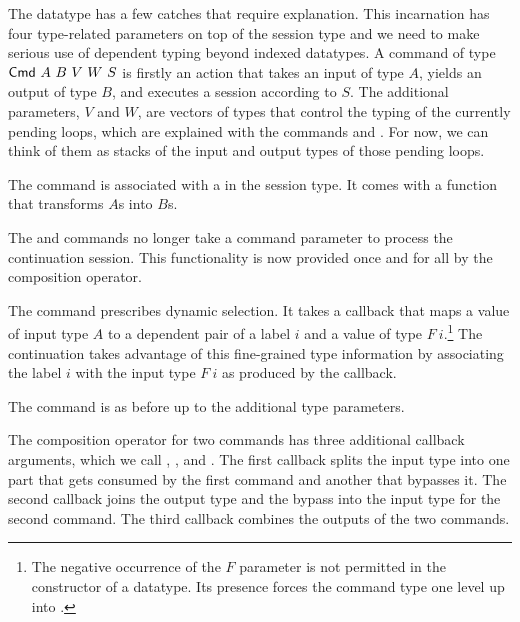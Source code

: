 \documentclass[acmsmall,screen]{acmart}
\begin{document}
The {\ACommand} datatype has a few catches that require
explanation.
This incarnation has four type-related parameters on
top of the session type and we need to make serious use of dependent
typing beyond indexed datatypes. A command of type {$\ACommand~A~B~V~W~S$} is
firstly an action that takes an input of type $A$, yields an output of
type $B$, and executes a session according to $S$. The additional
parameters, $V$ and $W$, are vectors of types that control the typing
of the currently pending loops, which are explained with the commands
{\AMU} and {\ACONTINUE}. For now, we can think of them as stacks of
the input and output types of those pending loops.

The {\ACSKIP} command is associated with a {\Atcfskip} in the session
type. It comes with a function that transforms $A$s into $B$s.

The {\ACSEND} and {\ACRECV} commands no longer take a command parameter
to process the continuation session. This functionality is now
provided once and for all by the composition operator.

The command {\ACSELECT} prescribes dynamic selection. It takes a
callback that maps a value of input type $A$ to a dependent pair of a
label $i$ and a value of type $F~i$.\footnote{The negative occurrence
  of the $F$ parameter is not permitted in the constructor of a
  {\ASet} datatype. Its presence forces the command type one level up
  into {\ASetOne}.} The continuation takes advantage of this
fine-grained type information by associating the label $i$ with the
input type $F~i$ as produced by the callback.

The {\ACCHOICE} command is as before up to the additional type parameters.

The composition operator for two commands has three additional
callback arguments, which we call {\Asplit}, {\Across}, and
{\Ajoin}. The first callback {\Asplit} splits the input type into one part that gets
consumed by the first command and another that bypasses it.
The second callback {\Across} joins the output type and the bypass into the
input type for the second command.
The third callback {\Ajoin} combines the outputs of the two commands.
\end{document}
